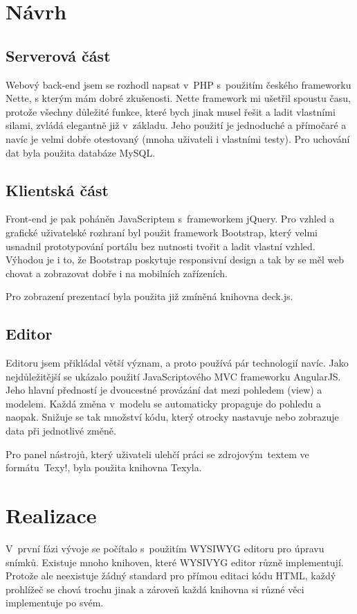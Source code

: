 \documentclass[11pt,twoside,a4paper]{book}
\begin{document}
\chapter{Návrh}

\section{Serverová část}
Webový back-end jsem se rozhodl napsat v~PHP s~použitím českého frameworku Nette, s kterým mám dobré zkušenosti. Nette framework mi ušetřil spoustu času, protože všechny důležité funkce, které bych jinak musel řešit a ladit vlastními silami, zvládá elegantně již v~základu. Jeho použití je jednoduché a přímočaré a navíc je velmi dobře otestovaný (mnoha uživateli i vlastními testy). Pro uchování dat byla použita databáze MySQL.


\section{Klientská část}
Front-end je pak poháněn JavaScriptem s~frameworkem jQuery. Pro vzhled a grafické uživatelské rozhraní byl použit framework Bootstrap, který velmi usnadnil prototypování portálu bez nutnosti tvořit a ladit vlastní vzhled. Výhodou je i to, že Bootstrap poskytuje responsivní design a tak by se měl web chovat a zobrazovat dobře i na mobilních zařízeních.

Pro zobrazení prezentací byla použita již zmíněná knihovna deck.js.


\section{Editor}
Editoru jsem přikládal větší význam, a proto používá pár technologií navíc. Jako nejdůležitější se ukázalo použití JavaScriptového MVC frameworku AngularJS. Jeho hlavní předností je dvoucestné provázání dat mezi pohledem (view) a modelem. Každá změna v~modelu se automaticky propaguje do pohledu a naopak. Snižuje se tak množství kódu, který otrocky nastavuje nebo zobrazuje data při jednotlivé změně.

Pro panel nástrojů, který uživateli ulehčí práci se zdrojovým~textem ve formátu~Texy!, byla použita knihovna Texyla.



\chapter{Realizace} \label{chap:realizace}
V~první fázi vývoje se počítalo s~použitím WYSIWYG editoru pro úpravu snímků. Existuje mnoho knihoven, které WYSIVYG
editor různě implementují. Protože ale neexistuje žádný standard pro přímou editaci kódu HTML, každý prohlížeč se chová
trochu jinak a zároveň každá knihovna si různé věci implementuje po svém.
\end{document}
